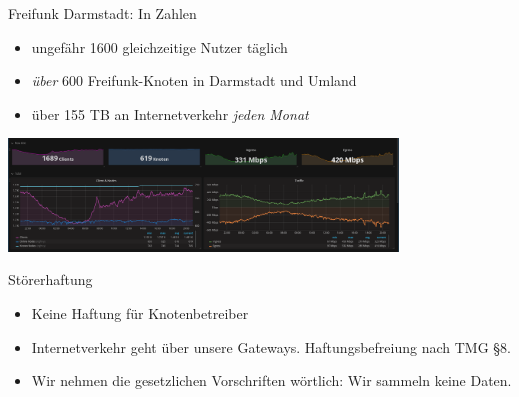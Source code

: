 \documentclass[t]{beamer}
\begin{document}
   \begin{frame}{Freifunk Darmstadt: In Zahlen}
    \begin{itemize}
	  \item ungefähr 1600 gleichzeitige Nutzer täglich
	  \item \emph{über} 600 Freifunk-Knoten in Darmstadt und Umland
	  \item über 155 TB an Internetverkehr \emph{jeden Monat}
    \end{itemize}
    \begin{center}
      \includegraphics[height=3cm]{images/stats/grafana/2017_05_02}
    \end{center}
  \end{frame}

  \begin{frame}{Störerhaftung}
    \begin{itemize}
      \item Keine Haftung für Knotenbetreiber
      \item Internetverkehr geht über unsere Gateways. Haftungsbefreiung nach TMG \S8.
      \item Wir nehmen die gesetzlichen Vorschriften wörtlich: Wir sammeln keine Daten.
    \end{itemize}
  \end{frame}
\end{document}
